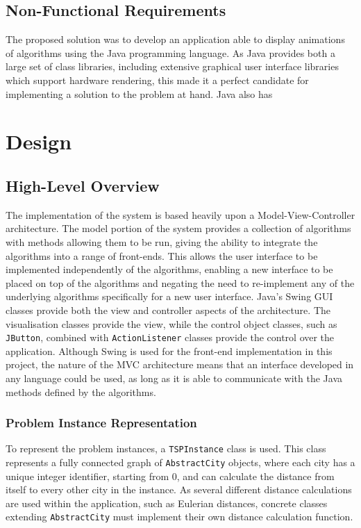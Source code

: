 \documentclass{l4proj}
\begin{document}
\section{Non-Functional Requirements}
The proposed solution was to develop an application able to display animations of algorithms using the Java programming 
language. As Java provides both a large set of class libraries, including extensive graphical user interface libraries which 
support hardware rendering, this made it a perfect candidate for implementing a solution to the problem at hand. Java also has 


\chapter{Design}
\label{design}

\section{High-Level Overview}
The implementation of the system is based heavily upon a Model-View-Controller architecture. The model portion of the system provides 
a collection of algorithms with methods allowing them to be run, giving the ability to integrate the algorithms into a range of front-ends. 
This allows the user interface to be implemented independently of the algorithms, enabling a new interface to be placed on top of the algorithms 
and negating the need to re-implement any of the underlying algorithms specifically for a new user interface. Java's Swing GUI classes 
provide both the view and controller aspects of the architecture. The visualisation classes provide the view, while the control object classes, 
such as \texttt{JButton}, combined with \texttt{ActionListener} classes provide the control over the application. Although Swing is used for 
the front-end implementation in this project, the nature of the MVC architecture means that an interface developed in any language could be 
used, as long as it is able to communicate with the Java methods defined by the algorithms.

\subsection{Problem Instance Representation}
To represent the problem instances, a \texttt{TSPInstance} class is used. This class represents a fully connected graph 
of \texttt{AbstractCity} objects, where each city has a unique integer identifier, starting from 0, and can calculate the 
distance from itself to every other city in the instance. As several different distance calculations are used within the 
application, such as Eulerian distances, concrete classes extending \texttt{AbstractCity} must implement their own distance calculation function.
\end{document}
